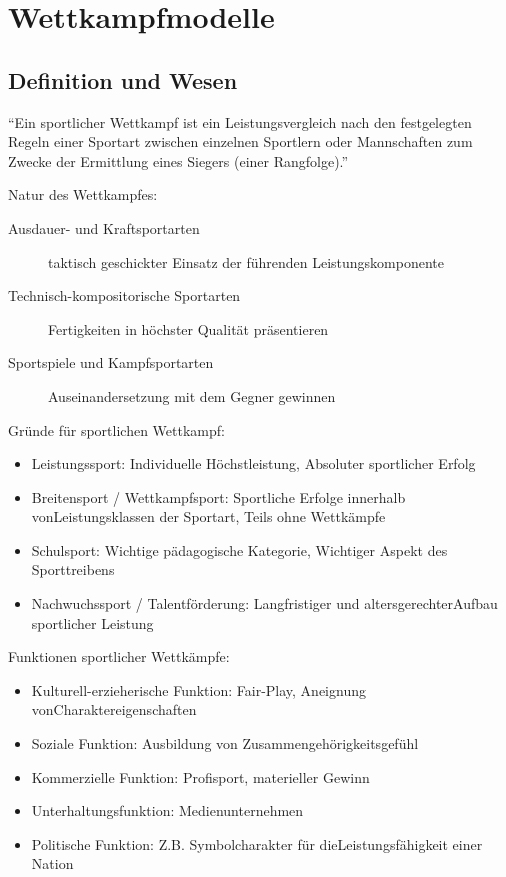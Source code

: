 
\section{Wettkampfmodelle}

\subsection{Definition und Wesen}

``Ein sportlicher Wettkampf ist ein Leistungsvergleich nach den festgelegten Regeln einer Sportart zwischen einzelnen Sportlern oder Mannschaften zum Zwecke der Ermittlung eines Siegers (einer Rangfolge).''

Natur des Wettkampfes:
\begin{description}
    \item[Ausdauer- und Kraftsportarten] taktisch geschickter Einsatz der führenden Leistungskomponente
    \item [Technisch-kompositorische Sportarten] Fertigkeiten in höchster Qualität präsentieren
    \item [Sportspiele und Kampfsportarten] Auseinandersetzung mit dem Gegner gewinnen
\end{description}

Gründe für sportlichen Wettkampf:
\begin{itemize}
    \item Leistungssport: Individuelle Höchstleistung, Absoluter sportlicher Erfolg
    \item Breitensport / Wettkampfsport: Sportliche Erfolge innerhalb vonLeistungsklassen der Sportart, Teils ohne Wettkämpfe
    \item Schulsport: Wichtige pädagogische Kategorie, Wichtiger Aspekt des Sporttreibens
    \item Nachwuchssport / Talentförderung: Langfristiger und altersgerechterAufbau sportlicher Leistung
\end{itemize}

Funktionen sportlicher Wettkämpfe:
\begin{itemize}
    \item Kulturell-erzieherische Funktion:  Fair-Play, Aneignung vonCharaktereigenschaften
    \item Soziale Funktion:  Ausbildung von Zusammengehörigkeitsgefühl
    \item Kommerzielle Funktion:  Profisport, materieller Gewinn
    \item Unterhaltungsfunktion:  Medienunternehmen
    \item Politische Funktion:  Z.B. Symbolcharakter für dieLeistungsfähigkeit einer Nation
\end{itemize}

